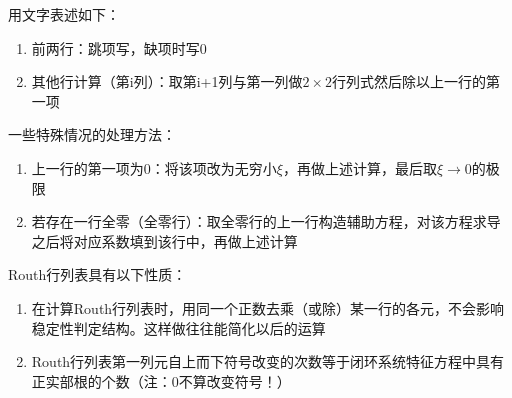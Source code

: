 \begin{definition}
    用文字表述如下：
    \begin{enumerate}
        \item 前两行：跳项写，缺项时写0
        \item 其他行计算（第i列）：取第i+1列与第一列做$2\times2$行列式然后除以上一行的第一项
    \end{enumerate}
    一些特殊情况的处理方法：
    \begin{enumerate}
        \item 上一行的第一项为0：将该项改为无穷小$\xi$，再做上述计算，最后取$\xi\rightarrow 0$的极限
        \item 若存在一行全零（全零行）：取全零行的上一行构造辅助方程，对该方程求导之后将对应系数填到该行中，再做上述计算
    \end{enumerate}
\end{definition}

\begin{property}
    Routh行列表具有以下性质：
    \begin{enumerate}
        \item 在计算Routh行列表时，用同一个正数去乘（或除）某一行的各元，不会影响稳定性判定结构。这样做往往能简化以后的运算
        \item Routh行列表第一列元自上而下符号改变的次数等于闭环系统特征方程中具有正实部根的个数（注：0不算改变符号！）
    \end{enumerate}
\end{property}

